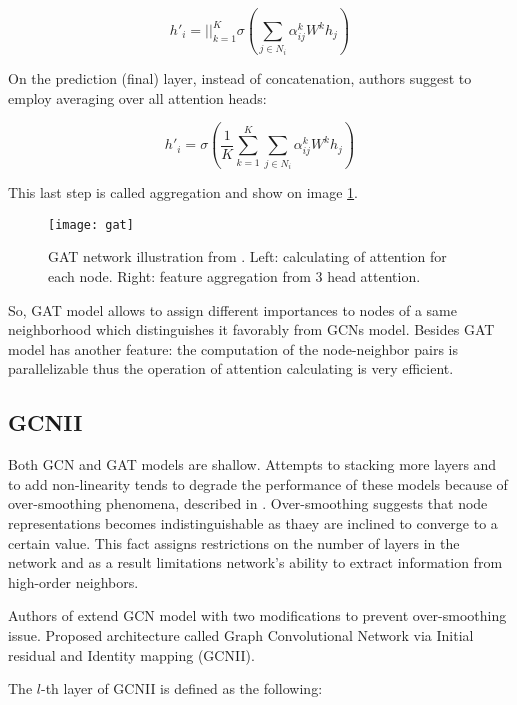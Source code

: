 \begin{equation}
    h'_i = ||_{k=1}^{K}  \sigma \left( \sum_{j \in {N_i}} \alpha^{k}_{ij} W^{k} h_j \right)
    \label{eq:multihead}
\end{equation}

On the prediction (final) layer, instead of concatenation, authors suggest to employ averaging over all attention heads:

\begin{equation}
    h'_i =  \sigma \left( \frac{1}{K} \sum_{k=1}^{K} \sum_{j \in {N_i}} \alpha^{k}_{ij} W^{k} h_j \right)
    \label{eq:multihead2}
\end{equation}


This last step is called aggregation and show on image \ref{fig:gat}.

\begin{figure}[t]
    \centering
    \texttt{[image: gat]}
    \caption{GAT network illustration from \cite{GAT}. Left: calculating of attention for each node. Right: feature aggregation from 3 head attention.}
    \label{fig:gat}
\end{figure}


So, GAT model allows to assign different importances to nodes of a same neighborhood which distinguishes it favorably from GCNs
model. Besides GAT model has another feature: the computation of the node-neighbor pairs is parallelizable thus the operation
of attention calculating is very efficient.

\subsection{GCNII}
Both GCN\cite{GCN} and GAT\cite{GAT} models are shallow. Attempts to stacking more layers and to add non-linearity
tends to degrade the performance of these models \cite{GCNII} because of over-smoothing phenomena, described in \cite{OverSmoothing}.
Over-smoothing suggests that node representations becomes indistinguishable as thaey are inclined to converge 
to a certain value. This fact assigns restrictions on the number of layers in the network and as a result
limitations network's ability to extract information from high-order neighbors.


Authors of \cite{GCNII} extend GCN model with two modifications to prevent over-smoothing issue. Proposed architecture 
called Graph Convolutional Network via Initial residual and Identity mapping (GCNII).

The $l$-th layer of GCNII is defined as the following:


